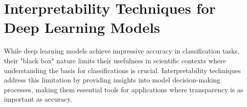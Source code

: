 \documentclass[a4paper,12pt]{report}
\begin{document}














\section*{Interpretability Techniques for Deep Learning Models}
While deep learning models achieve impressive accuracy in classification tasks, their "black box" nature limits their usefulness in scientific contexts where understanding the basis for classifications is crucial. Interpretability techniques address this limitation by providing insights into model decision-making processes, making them essential tools for applications where transparency is as important as accuracy.
\end{document}

